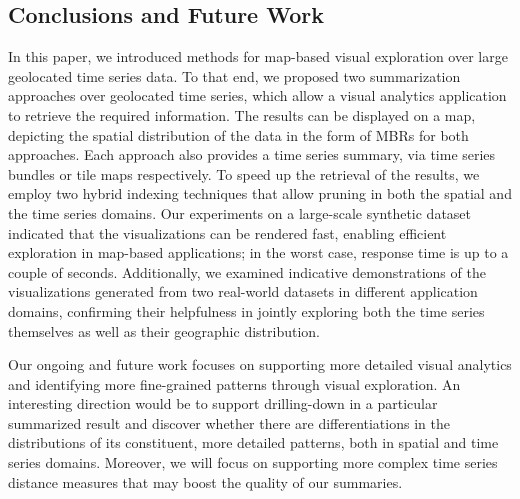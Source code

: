 \subsection{Conclusions and Future Work}
\label{sec:conclusions}

In this paper, we introduced methods for map-based visual exploration over large geolocated time series data. To that end, we proposed two summarization approaches over geolocated time series, which allow a visual analytics application to retrieve the required information. The results can be displayed on a map, depicting the spatial distribution of the data in the form of MBRs for both approaches. Each approach also provides a time series summary, via time series bundles or tile maps respectively. To speed up the retrieval of the results, we employ two hybrid indexing techniques that allow pruning in both the spatial and the time series domains. Our experiments on a large-scale synthetic dataset indicated that the visualizations can be rendered fast, enabling efficient exploration in map-based applications; in the worst case, response time is up to a couple of seconds. Additionally, we examined indicative demonstrations of the visualizations generated from two real-world datasets in different application domains, confirming their helpfulness in jointly exploring both the time series themselves as well as their geographic distribution. 

Our ongoing and future work focuses on supporting more detailed visual analytics and identifying more fine-grained patterns through visual exploration. An interesting direction would be to support drilling-down in a particular summarized result and discover whether there are differentiations in the distributions of its constituent, more detailed patterns, both in spatial and time series domains. Moreover, we will focus on supporting more complex time series distance measures that may boost the quality of our summaries.